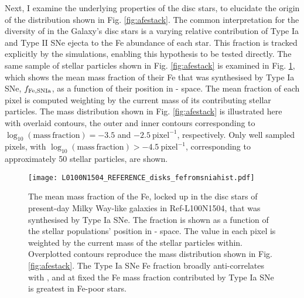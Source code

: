 Next, I examine the underlying properties of the disc stars, to elucidate the origin of the distribution shown in Fig. \ref{fig:afestack}. The common interpretation for the diversity of \afe{} in the Galaxy's disc stars is a varying relative contribution of Type Ia and Type II SNe ejecta to the Fe abundance of each star. This fraction is tracked explicitly by the simulations, enabling this hypothesis to be tested directly. The same sample of stellar particles shown in Fig. \ref{fig:afestack} is examined in Fig. \ref{fig:afesniafrac}, which shows the mean mass fraction of their Fe that was synthesised by Type Ia SNe, $f_{\rm Fe,SNIa}$, as a function of their position in \afe{}-\feh{} space. The mean fraction of each pixel is computed weighting by the current mass of its contributing stellar particles. The mass distribution shown in Fig. \ref{fig:afestack} is illustrated here with overlaid contours, the outer and inner contours corresponding to $\log_{10}{(\mathrm{mass\ fraction})} = -3.5$ and $-2.5\ \mathrm{pixel^{-1}}$, respectively. Only well sampled pixels, with $\log_{10}{(\mathrm{mass\ fraction})} > -4.5\ \mathrm{pixel^{-1}}$, corresponding to approximately 50 stellar particles, are shown.

\begin{figure}
\texttt{[image: L0100N1504\_REFERENCE\_disks\_fefromsniahist.pdf]}
\caption[Two-dimensional histogram showing the mean mass fraction of stellar Fe which was ejected by Type Ia SNe, as a function of \afe{} and \feh{} for Ref-L100N1504 disc stars]{\label{fig:afesniafrac} The mean mass fraction of the Fe, locked up in the disc stars of present-day Milky Way-like galaxies in Ref-L100N1504, that was synthesised by Type Ia SNe. The fraction is shown as a function of the stellar populations' position in \afe{}-\feh{} space. The value in each  pixel is weighted by the current mass of the stellar particles within. Overplotted contours reproduce the mass distribution shown in Fig. \ref{fig:afestack}. The Type Ia SNe Fe fraction broadly anti-correlates with \afe{}, and at fixed \afe{} the Fe mass fraction contributed by Type Ia SNe is greatest in Fe-poor stars.}
\end{figure}

